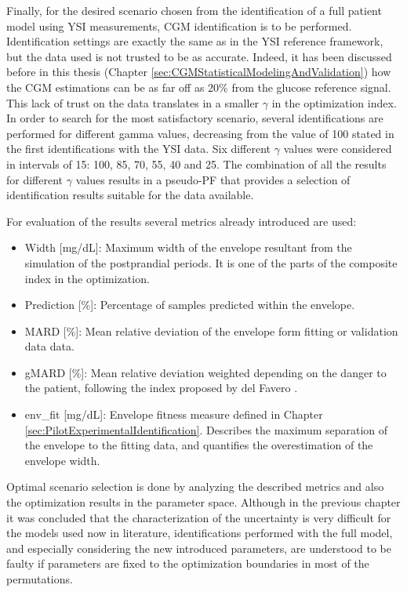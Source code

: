 Finally, for the desired scenario chosen from the identification of a full patient model using YSI measurements, CGM identification is to be performed. Identification settings are exactly the same as in the YSI reference framework, but the data used is not trusted to be as accurate. Indeed, it has been discussed before in this thesis (Chapter \ref{sec:CGMStatisticalModelingAndValidation}) how the CGM estimations can be as far off as 20\% from the glucose reference signal. This lack of trust on the data translates in a smaller $\gamma$ in the optimization index. In order to search for the most satisfactory scenario, several identifications are performed for different gamma values, decreasing from the value of 100 stated in the first identifications with the YSI data. Six different $\gamma$ values were considered in intervals of 15: 100, 85, 70, 55, 40 and 25. The combination of all the results for different $\gamma$ values results in a pseudo-PF that provides a selection of identification results suitable for the data available.

For evaluation of the results several metrics already introduced are used:

\begin{itemize}
	\item Width [mg/dL]: Maximum width of the envelope resultant from the simulation of the postprandial periods. It is one of the parts of the composite index in the optimization.
	\item Prediction [\%]: Percentage of samples predicted within the envelope.
	\item MARD [\%]: Mean relative deviation of the envelope form fitting or validation data data.
	\item gMARD [\%]: Mean relative deviation weighted depending on the danger to the patient, following the index proposed by del Favero \cite{del2012glucose}.
	\item env\_fit [mg/dL]: Envelope fitness measure defined in Chapter \ref{sec:PilotExperimentalIdentification}. Describes the maximum separation of the envelope to the fitting data, and quantifies the overestimation of the envelope width.
\end{itemize}

Optimal scenario selection is done by analyzing the described metrics and also the optimization results in the parameter space. Although in the previous chapter it was concluded that the characterization of the uncertainty is very difficult for the models used now in literature, identifications performed with the full model, and especially considering the new introduced parameters, are understood to be faulty if parameters are fixed to the optimization boundaries in most of the permutations.


